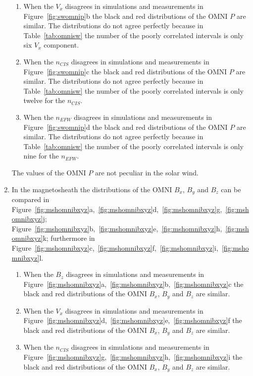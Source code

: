 \documentclass[draft]{agujournal2019}
\begin{document}
\begin{enumerate}
\begin{enumerate}
\item When the $V_{x}$ disagrees in simulations and measurements in Figure~\ref{fig:swomnip}b the black and red distributions of the OMNI $P$ are similar. The distributions do not agree perfectly because in Table~\ref{tab:omnisw} the number of the poorly correlated intervals is only six $V_{x}$ component.

\item When the $n_{CIS}$ disagrees in simulations and measurements in Figure~\ref{fig:swomnip}c the black and red distributions of the OMNI $P$ are similar. The distributions do not agree perfectly because in Table~\ref{tab:omnisw} the number of the poorly correlated intervals is only twelve for the $n_{CIS}$.

\item When the $n_{EFW}$ disagrees in simulations and measurements in Figure~\ref{fig:swomnip}d the black and red distributions of the OMNI $P$ are similar. The distributions do not agree perfectly because in Table~\ref{tab:omnisw} the number of the poorly correlated intervals is only nine for the $n_{EFW}$.
\end{enumerate}
The values of the OMNI $P$ are not peculiar in the solar wind. 

\item In the magnetosheath the distributions of the OMNI $B_{x}$, $B_{y}$ and $B_{z}$ can be compared in Figure~\ref{fig:mshomnibxyz}a,~\ref{fig:mshomnibxyz}d,~\ref{fig:mshomnibxyz}g,~\ref{fig:mshomnibxyz}j; Figure~\ref{fig:mshomnibxyz}b,~\ref{fig:mshomnibxyz}e,~\ref{fig:mshomnibxyz}h,~\ref{fig:mshomnibxyz}k; furthermore in Figure~\ref{fig:mshomnibxyz}c,~\ref{fig:mshomnibxyz}f,~\ref{fig:mshomnibxyz}i,~\ref{fig:mshomnibxyz}l. 
\begin{enumerate}
\item When the $B_{z}$ disagrees in simulations and measurements in Figure~\ref{fig:mshomnibxyz}a,~\ref{fig:mshomnibxyz}b,~\ref{fig:mshomnibxyz}c the black and red distributions of the OMNI $B_{x}$, $B_{y}$ and $B_{z}$ are similar.

\item When the $V_{x}$ disagrees in simulations and measurements in Figure~\ref{fig:mshomnibxyz}d,~\ref{fig:mshomnibxyz}e,~\ref{fig:mshomnibxyz}f the black and red distributions of the OMNI $B_{x}$, $B_{y}$ and $B_{z}$ are similar.
 
\item When the $n_{CIS}$ disagrees in simulations and measurements in Figure~\ref{fig:mshomnibxyz}g,~\ref{fig:mshomnibxyz}h,~\ref{fig:mshomnibxyz}i the black and red distributions of the OMNI $B_{x}$, $B_{y}$ and $B_{z}$ are similar.


\end{enumerate}
\end{enumerate}
\end{document}
